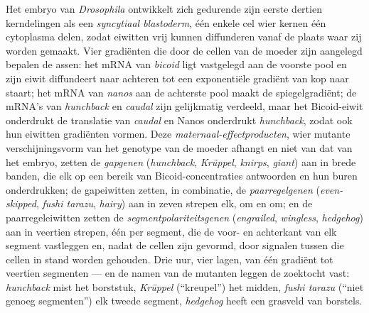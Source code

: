 \begin{definition}\label{def:b3:developmental-genetics:hierarchy}
Het embryo van \emph{Drosophila} ontwikkelt zich gedurende zijn eerste
dertien kerndelingen als een \emph{syncytiaal blastoderm}, één enkele
cel wier kernen één cytoplasma delen, zodat eiwitten vrij kunnen
diffunderen vanaf de plaats waar zij worden gemaakt. Vier gradiënten
die door de cellen van de moeder zijn aangelegd bepalen de assen: het
mRNA van \emph{bicoid} ligt vastgelegd aan de voorste pool en zijn
eiwit diffundeert naar achteren tot een exponentiële gradiënt van kop
naar staart; het mRNA van \emph{nanos} aan de achterste pool maakt de
spiegelgradiënt; de mRNA's van \emph{hunchback} en \emph{caudal} zijn
gelijkmatig verdeeld, maar het Bicoid-eiwit onderdrukt de translatie
van \emph{caudal} en Nanos onderdrukt \emph{hunchback}, zodat ook hun
eiwitten gradiënten vormen. Deze \emph{maternaal-effectproducten},
wier mutante verschijningsvorm van het genotype van de moeder afhangt
en niet van dat van het embryo, zetten de \emph{gapgenen}
(\emph{hunchback}, \emph{Krüppel}, \emph{knirps}, \emph{giant}) aan in
brede banden, die elk op een bereik van Bicoid-concentraties antwoorden
en hun buren onderdrukken; de gapeiwitten zetten, in combinatie, de
\emph{paarregelgenen} (\emph{even-skipped}, \emph{fushi tarazu},
\emph{hairy}) aan in zeven strepen elk, om en om; en de
paarregeleiwitten zetten de \emph{segmentpolariteitsgenen}
(\emph{engrailed}, \emph{wingless}, \emph{hedgehog}) aan in veertien
strepen, één per segment, die de voor- en achterkant van elk segment
vastleggen en, nadat de cellen zijn gevormd, door signalen tussen die
cellen in stand worden gehouden. Drie uur, vier lagen, van één gradiënt
tot veertien segmenten --- en de namen van de mutanten leggen de
zoektocht vast: \emph{hunchback} mist het borststuk, \emph{Krüppel}
(``kreupel'') het midden, \emph{fushi tarazu} (``niet genoeg
segmenten'') elk tweede segment, \emph{hedgehog} heeft een grasveld van
borstels.
\end{definition}

